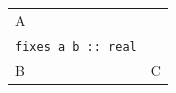 \documentclass{article}
\begin{document}
\begin{tabularx}{\linewidth}{|l|X|}
\hline
A & \makecell[l]{\verb|theorem| \\ \quad\verb|fixes a b :: real|} \\ \hline
B & C \\ \hline
\end{tabularx}
\end{document}

